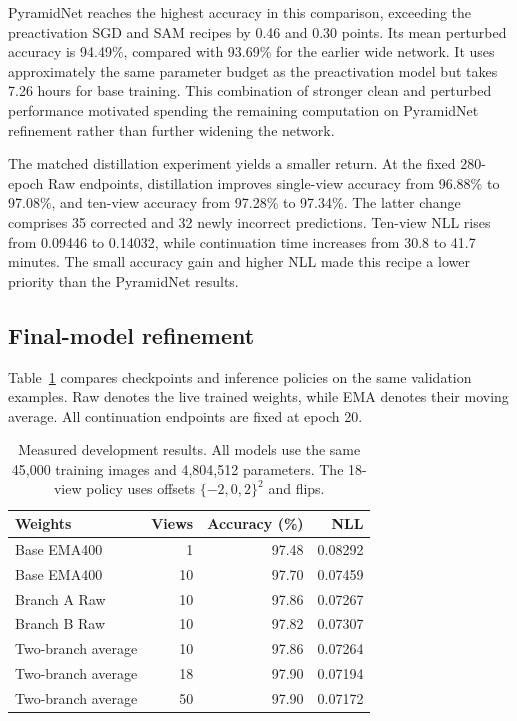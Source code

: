 \documentclass[letterpaper]{article}
\begin{document}
PyramidNet reaches the highest accuracy in this comparison, exceeding the preactivation SGD and SAM recipes by 0.46 and 0.30 points. Its mean perturbed accuracy is 94.49\%, compared with 93.69\% for the earlier wide network. It uses approximately the same parameter budget as the preactivation model but takes 7.26 hours for base training. This combination of stronger clean and perturbed performance motivated spending the remaining computation on PyramidNet refinement rather than further widening the network.

The matched distillation experiment yields a smaller return. At the fixed 280-epoch Raw endpoints, distillation improves single-view accuracy from 96.88\% to 97.08\%, and ten-view accuracy from 97.28\% to 97.34\%. The latter change comprises 35 corrected and 32 newly incorrect predictions. Ten-view NLL rises from 0.09446 to 0.14032, while continuation time increases from 30.8 to 41.7 minutes. The small accuracy gain and higher NLL made this recipe a lower priority than the PyramidNet results.

\subsection{Final-model refinement}
Table~\ref{tab:results} compares checkpoints and inference policies on the same validation examples. Raw denotes the live trained weights, while EMA denotes their moving average. All continuation endpoints are fixed at epoch 20.
\begin{table}[t]
\centering\small
\begin{tabular}{lrrr}
\hline
Weights & Views & Accuracy (\%) & NLL\\\hline
Base EMA400 &1&97.48&0.08292\\
Base EMA400 &10&97.70&0.07459\\
Branch A Raw &10&97.86&0.07267\\
Branch B Raw &10&97.82&0.07307\\
Two-branch average &10&97.86&0.07264\\
Two-branch average &18&97.90&0.07194\\
Two-branch average &50&97.90&0.07172\\\hline
\end{tabular}
\caption{Measured development results. All models use the same 45,000 training images and 4,804,512 parameters. The 18-view policy uses offsets $\{-2,0,2\}^2$ and flips.}
\label{tab:results}
\end{table}
\end{document}
